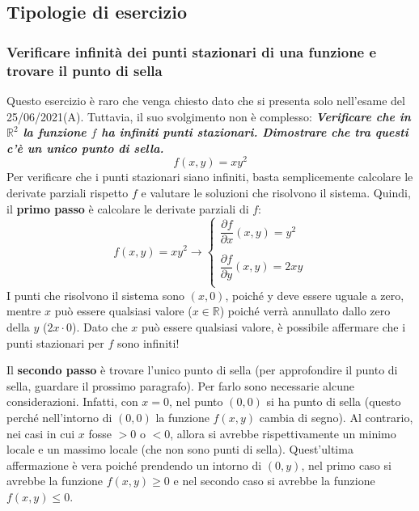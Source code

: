 \documentclass[a4paper]{article}
\begin{document}
	\subsection{Tipologie di esercizio}

	\subsubsection{Verificare infinità dei punti stazionari di una funzione e trovare il punto di sella}\label{par: verificare infinità dei punti stazionari di una funzione e trovare il punto di sella}

	Questo esercizio è raro che venga chiesto dato che si presenta solo nell'esame del 25/06/2021(A). Tuttavia, il suo svolgimento non è complesso: \textcolor{Green4}{\textbf{\emph{Verificare che in $\mathbb{R}^{2}$ la funzione $f$ ha infiniti punti stazionari. Dimostrare che tra questi c'è un unico punto di sella.}}
	\begin{equation*}
		f\left(x,y\right) = xy^{2}
	\end{equation*}}
	Per verificare che i punti stazionari siano infiniti, basta semplicemente calcolare le derivate parziali rispetto $f$ e valutare le soluzioni che risolvono il sistema. Quindi, il \textbf{primo passo} è calcolare le derivate parziali di $f$:
	\begin{equation*}
		f\left(x,y\right) = xy^{2} \longrightarrow
		\begin{cases}
			\dfrac{\partial f}{\partial x}\left(x,y\right) = y^{2} \\
			\\
			\dfrac{\partial f}{\partial y}\left(x,y\right) = 2xy \\
		\end{cases}
	\end{equation*}
	I punti che risolvono il sistema sono $\left(x, 0\right)$, poiché y deve essere uguale a zero, mentre $x$ può essere qualsiasi valore ($x \in \mathbb{R}$) poiché verrà annullato dallo zero della $y$ ($2x \cdot 0$). Dato che $x$ può essere qualsiasi valore, è possibile affermare che i punti stazionari per $f$ sono infiniti!\newline

	\noindent
	Il \textbf{secondo passo} è trovare l'unico punto di sella (per approfondire il punto di sella, guardare il prossimo paragrafo). Per farlo sono necessarie alcune considerazioni. Infatti, con $x = 0$, nel punto $\left(0,0\right)$ si ha punto di sella (questo perché nell'intorno di $\left(0,0\right)$ la funzione $f\left(x,y\right)$ cambia di segno). Al contrario, nei casi in cui $x$ fosse $> 0$ o $< 0$, allora si  avrebbe rispettivamente un minimo locale e un massimo locale (che non sono punti di sella). Quest'ultima affermazione è vera poiché prendendo un intorno di $\left(0,y\right)$, nel primo caso si avrebbe la funzione $f\left(x,y\right) \ge 0$ e nel secondo caso si avrebbe la funzione $f\left(x,y\right) \le 0$.\newpage
\end{document}
